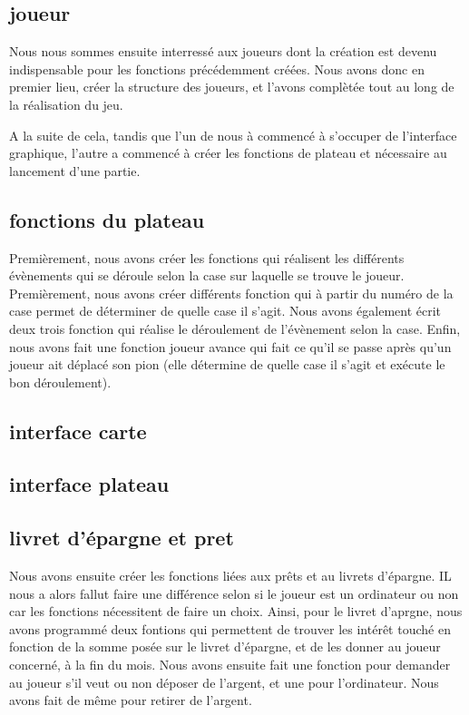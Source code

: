 \documentclass[a4paper, 11pt]{report}
\begin{document}
\subsection{joueur}
Nous nous sommes ensuite interressé aux joueurs dont la création est devenu indispensable pour les fonctions précédemment créées.
Nous avons donc en premier lieu, créer la structure des joueurs, et l'avons complètée tout au long de la réalisation du jeu.

A la suite de cela, tandis que l'un de nous à commencé à s'occuper de l'interface graphique, l'autre a commencé à créer les fonctions de plateau et nécessaire au lancement d'une partie.

\subsection{fonctions du plateau}
Premièrement, nous avons créer les fonctions qui réalisent les différents évènements qui se déroule selon la case sur laquelle se trouve le joueur. Premièrement, nous avons créer différents fonction qui à partir du numéro de la case permet de déterminer de quelle case il s'agit. Nous avons également écrit deux trois fonction qui réalise le déroulement de l'évènement selon la case. Enfin, nous avons fait une fonction joueur avance qui fait ce qu'il se passe après qu'un joueur ait déplacé son pion (elle détermine de quelle case il s'agit et exécute le bon déroulement).


\subsection{interface carte}









\subsection{interface plateau}









\subsection{livret d'épargne et pret}
Nous avons ensuite créer les fonctions liées aux prêts et au livrets d'épargne.
IL nous a alors fallut faire une différence selon si le joueur est un ordinateur ou non car les fonctions nécessitent de faire un choix. Ainsi, pour le livret d'aprgne, nous avons programmé deux fontions qui permettent de trouver les intérêt touché en fonction de la somme posée sur le livret d'épargne, et de les donner au joueur concerné, à la fin du mois. Nous avons ensuite fait une fonction pour demander au joueur s'il veut ou non déposer de l'argent, et une pour l'ordinateur. Nous avons fait de même pour retirer de l'argent.
\end{document}
